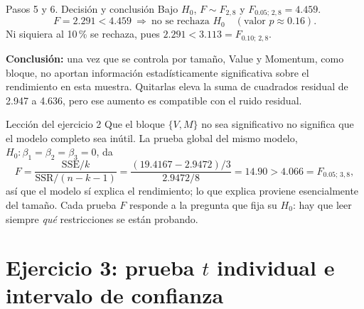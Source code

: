 \documentclass[11pt,letterpaper]{article}
\newcommand{\SSR}{\mathrm{SSR}}
\newcommand{\SSE}{\mathrm{SSE}}
\begin{document}
\begin{paso}{Pasos 5 y 6. Decisión y conclusión}
Bajo $H_0$, $F\sim F_{2,8}$ y $F_{0.05;\,2,8}=4.459$.
\[
F=2.291<4.459\ \Longrightarrow\ \text{no se rechaza }H_0\quad(\text{valor }p\approx0.16).
\]
Ni siquiera al 10\,\% se rechaza, pues $2.291<3.113=F_{0.10;\,2,8}$.

\textbf{Conclusión:} una vez que se controla por tamaño, Value y Momentum, como bloque, no aportan
información estadísticamente significativa sobre el rendimiento en esta muestra. Quitarlas eleva la
suma de cuadrados residual de 2.947 a 4.636, pero ese aumento es compatible con el ruido residual.
\end{paso}

\begin{center}
\end{center}

\begin{nota}{Lección del ejercicio 2}
Que el bloque $\{V,M\}$ no sea significativo no significa que el modelo completo sea inútil. La
prueba global del mismo modelo, $H_0:\beta_1=\beta_2=\beta_3=0$, da
\[
F=\frac{\SSE/k}{\SSR/(n-k-1)}=\frac{(19.4167-2.9472)/3}{2.9472/8}=14.90>4.066=F_{0.05;\,3,8},
\]
así que el modelo sí explica el rendimiento; lo que explica proviene esencialmente del tamaño. Cada
prueba $F$ responde a la pregunta que fija su $H_0$: hay que leer siempre \emph{qué} restricciones se
están probando.
\end{nota}

\section{Ejercicio 3: prueba $t$ individual e intervalo de confianza}
\end{document}
